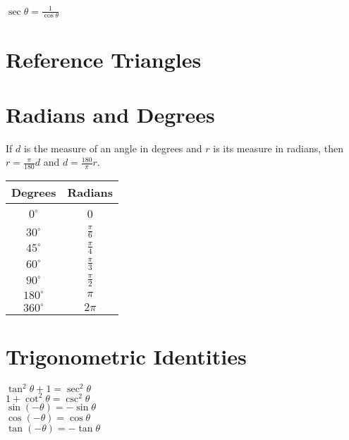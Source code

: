 \documentclass[12 pt]{article}
\begin{document}
\begin{multicols}{2}
\begin{multicols}{2}
$\displaystyle\sec \theta=\frac{1}{\cos \theta}$

\bigskip

\vfill\null

\end{multicols}

\section*{Reference Triangles}

\begin{center}

\end{center}

\section*{Radians and Degrees}
If $d$ is the measure of an angle in degrees and $r$ is its measure in radians, then $ r=\frac{\pi}{180}d$ and $ d=\frac{180}{\pi}r$.

\begin{center}
\begin{tabular}{c c}
Degrees & Radians\\ \hline
$0^\circ$ & 0\\
$30^\circ$ & $\frac{\pi}{6}$ \\
$45^\circ$ & $\frac{\pi}{4}$\\
$60^\circ$ & $\frac{\pi}{3}$\\
$90^\circ$ & $\frac{\pi}{2}$\\
$180^\circ$ & $\pi$\\
$360^\circ$ & $2\pi$
\end{tabular}
\end{center}



\newpage
\section*{Trigonometric Identities}


$\tan ^{2} \theta+1=\sec ^{2} \theta$\\

$1+\cot ^{2} \theta=\csc ^{2} \theta$\\

$\sin (-\theta)=-\sin \theta$\\

$\cos (-\theta)=\cos \theta$\\

$\tan (-\theta)=-\tan \theta$\\


\end{multicols}
\end{document}
